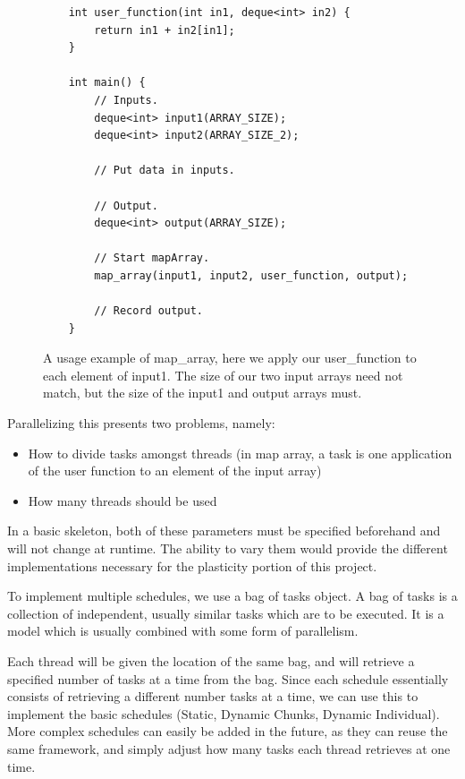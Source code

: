 \begin{figure}
	\begin{lstlisting}
	int user_function(int in1, deque<int> in2) {
		return in1 + in2[in1];
	}

	int main() {
		// Inputs.
		deque<int> input1(ARRAY_SIZE);
		deque<int> input2(ARRAY_SIZE_2);

		// Put data in inputs.

		// Output.
		deque<int> output(ARRAY_SIZE);

		// Start mapArray.
		map_array(input1, input2, user_function, output);

		// Record output.
	}
	\end{lstlisting}

	\caption{A usage example of map\_array, here we apply our user\_function to each element of input1. The size of our two input arrays need not match, but the size of the input1 and output arrays must.}
	\label{fig:implementation_map_array_usage_example}
\end{figure}



\begin{minipage}{\textwidth}

Parallelizing this presents two problems, namely:

\begin{itemize}
	\item How to divide tasks amongst threads (in map array, a task is one application of the user function to an element of the input array)
	\item How many threads should be used
\end{itemize}

\end{minipage}
 
In a basic skeleton, both of these parameters must be specified beforehand and will not change at runtime. The ability to vary them would provide the different implementations necessary for the plasticity portion of this project.

To implement multiple schedules, we use a bag of tasks object. A bag of tasks is a collection of independent, usually similar tasks which are to be executed. It is a model which is usually combined with some form of parallelism.

Each thread will be given the location of the same bag, and will retrieve a specified number of tasks at a time from the bag. Since each schedule essentially consists of retrieving a different number tasks at a time, we can use this to implement the basic schedules (Static, Dynamic Chunks, Dynamic Individual). More complex schedules can easily be added in the future, as they can reuse the same framework, and simply adjust how many tasks each thread retrieves at one time.

